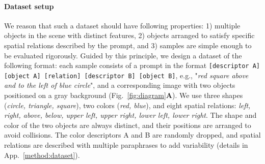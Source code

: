 \documentclass[10pt,twocolumn,letterpaper]{article}
\begin{document}
\paragraph{Dataset setup}
We reason that such a dataset should have following properties:
1) multiple objects in the scene with distinct features,
2) objects arranged to satisfy specific spatial relations described by the prompt, and
3) samples are simple enough to be evaluated rigorously. Guided by this principle, we design a dataset of the following format: each sample consists of a prompt in the format \texttt{[descriptor A] [object A] [relation] [descriptor B] [object B]}, e.g., "\textit{red square above and to the left of blue circle}", and a corresponding image with two objects positioned on a gray background (Fig.~\ref{fig:diagram}\textbf{A}). %
We use three shapes (\textit{circle, triangle, square}), two colors (\textit{red, blue}), and eight spatial relations: \textit{left, right, above, below, upper left, upper right, lower left, lower right}. 
The shape and color of the two objects are always distinct, and their positions are arranged to avoid collisions. 
The color descriptors A and B are randomly dropped, and spatial relations are described with multiple paraphrases to add variability (details in App.~\ref{method:dataset}). 

\end{document}
